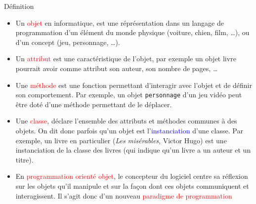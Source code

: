 \documentclass[10pt]{beamer}
\begin{document}
\begin{frame}
\mframe{\POO}
\begin{alertblock}{Définition}
\begin{itemize}
\item<1-> Un \textcolor{red}{objet} en informatique, est une réprésentation dans un langage de programmation d'un élément du monde  physique (voiture, chien, film, \dots),  ou d'un concept (jeu, personnage, \dots).
\item<2-> Un \textcolor{red}{attribut} est une caractéristique de l'objet, par exemple un objet livre pourrait avoir comme attribut son auteur, son nombre de pages, \dots
\item<3-> Une \textcolor{red}{méthode} est une fonction permettant d'interagir avec l'objet et de définir son comportement. Par exemple, un objet {\tt personnage} d'un jeu vidéo peut être doté d'une méthode permettant de le déplacer.
\item<4-> Une \textcolor{red}{classe}, déclare l'ensemble des attributs et méthodes communes à des objets. On dit donc parfois qu'un objet est l'\textcolor{blue}{instanciation} d'une classe. Par exemple, un livre en particulier (\textit{Les misérables}, Victor Hugo) est une instanciation de la classe des livres (qui indique qu'un livre a un auteur et un titre).
\item<5-> En \textcolor{red}{programmation orienté objet}, le concepteur du logiciel centre sa réflexion sur les objets qu'il manipule et sur la façon dont ces objets communiquent et interagissent. Il s'agit donc d'un nouveau \textcolor{red}{paradigme de programmation}
\end{itemize}
\end{alertblock}
\end{frame}
\end{document}
